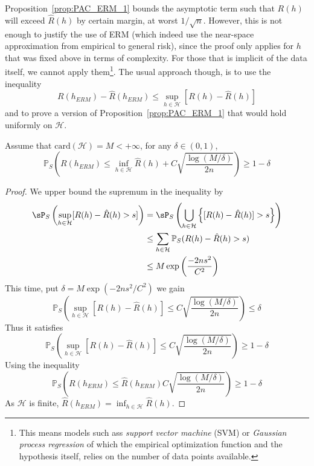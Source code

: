 Proposition~\ref{prop:PAC_ERM_1} bounds the asymptotic term such that $R(h)$ will exceed $\hat{R}(h)$ by certain margin, at worst $1/\sqrt{n}$. However, this is not enough to justify the use of ERM (which indeed use the near-space approximation from empirical to general risk), since the proof only applies for $h$ that was fixed above in terms of complexity. For those that is implicit of the data itself, we cannot apply them\footnote{This means models such ass \textit{support vector machine} (SVM) or \textit{Gaussian process regression} of which the empirical optimization function and the hypothesis itself, relies on the number of data points available.}. The usual approach though, is to use the inequality 
\begin{equation}
    R(h_{ERM}) - \hat{R}(h_{ERM}) \leq \sup_{h\in\mathcal{H}} \left[R(h)-\hat{R}(h)\right]
\end{equation}
and to prove a version of Proposition~\ref{prop:PAC_ERM_1} that would hold uniformly on $\mathcal{H}$. 
\begin{theorem}
    Assume that $\mathrm{card}(\mathcal{H})=M<+\infty$, for any $\delta\in(0,1)$, 
    \begin{equation}
        \mathbb{P}_{S}\left( R(h_{ERM}) \leq \inf_{h\in\mathcal{H}} \hat{R}(h) + C\sqrt{\frac{\log{(M/\delta)}}{2n}} \right) \geq 1 - \delta
    \end{equation}
\end{theorem}
\begin{proof}
    We upper bound the supremum in the inequality by 
    \begin{equation}
        \begin{split}
            \sP_{S} \left(\sup_{h\in\mathcal{H}}[R(h)-\hat{R}(h)>s]\right)
            & = \sP_{S} \left(\bigcup_{h\in\mathcal{H}} \left\{ [R(h)-\hat{R}(h)]>s \right\} \right)\\
            & \leq \sum_{h\in\mathcal{H}} \mathbb{P}_{S}(R(h)-\hat{R}(h)>s)\\
            & \leq M\exp{\left(\frac{-2ns^2}{C^2}\right)}
        \end{split}
    \end{equation}
    This time, put $\delta = M\exp{(-2ns^2/C^2)}$ we gain 
\begin{equation}
     \mathbb{P}_{S}\left( \sup_{h\in\mathcal{H}}[R(h)-\hat{R}(h)] \leq  C\sqrt{\frac{\log{(M/\delta)}}{2n}} \right) \leq \delta
\end{equation}
Thus it satisfies 
\begin{equation}
     \mathbb{P}_{S}\left( \sup_{h\in\mathcal{H}}[R(h)-\hat{R}(h)] \leq  C\sqrt{\frac{\log{(M/\delta)}}{2n}} \right) \geq 1-\delta
\end{equation}
Using the inequality
\begin{equation}
    \mathbb{P}_{S}\left( R(h_{ERM}) \leq \hat{R}(h_{ERM})  C\sqrt{\frac{\log{(M/\delta)}}{2n}} \right) \geq 1-\delta    
\end{equation}
As $\mathcal{H}$ is finite, $\hat{R}(h_{ERM})=\inf_{h\in\mathcal{H}}\hat{R}(h)$.
\end{proof}
